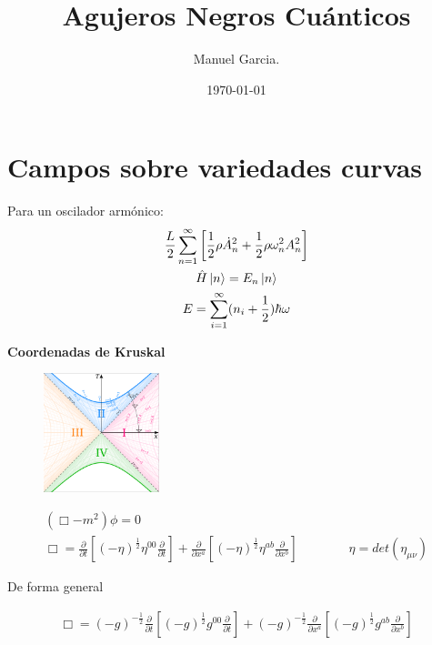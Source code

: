 \documentclass{article}
\title{Agujeros Negros Cuánticos}
\author{Manuel Garcia.}
\date{\today}
\begin{document}
\maketitle

\section{Campos sobre variedades curvas }
Para un oscilador armónico: 
\begin{gather*}
  \frac{L }{2} \displaystyle\sum_{n=1 }^{ \infty} \left[\frac{1}{2}\rho \dot A _n^2 + \frac{1}{2} \rho \omega_n^2 A^2_n \right] \\
  \hat H \ket{n } = E_n \ket{n } \\
  E = \displaystyle\sum_{i=1 }^{\infty} (n_i + \frac{1}{2}) \hbar  \omega
\end{gather*}

\textbf{Coordenadas de Kruskal}
\begin{figure}[H]
  \begin{center}
    \includegraphics[width=0.3\textwidth]{kruskal.png}
  \end{center}
\end{figure}
\begin{gather*}
  (\Box - m^2 )  \phi = 0 \\
  \Box = \frac{\partial  }{\partial t } \left[(-\eta)^{\frac{1}{2}}\eta ^ {00 } \frac{\partial  }{\partial t }\right] + \frac{\partial  }{\partial x^a  } \left[(-\eta) ^ {\frac{1}{2}}\eta ^{ab } \frac{\partial  }{\partial x^b}\right] \qquad \qquad \eta = det(\eta _{\mu\nu} )
\end{gather*}

\hfill


\hfill

De forma general 

\begin{gather*}
  \Box =
    (-g) ^ {-\frac{1}{2}}\frac{\partial  }{\partial t } \left[(-g) ^ {\frac{1}{2}}g ^ {00 } \frac{\partial  }{\partial t }\right] 
  + (-g) ^ {-\frac{1}{2}}\frac{\partial  }{\partial x^a} \left[(-g) ^ {\frac{1}{2}} g ^{ab } \frac{\partial  }{\partial x^b}\right] 
\end{gather*}
\end{document}
